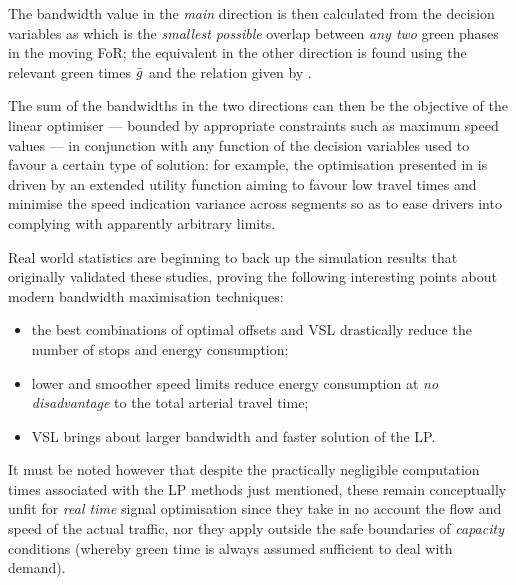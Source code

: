 The bandwidth value in the \emph{main} direction is then calculated from the decision variables as
which is the \emph{smallest possible} overlap between \emph{any two} green phases in the moving FoR; the equivalent in the other direction is found using the relevant green times $\bar{g_{}}$ and the relation given by .

The sum of the bandwidths in the two directions can then be the objective of the linear
optimiser — bounded by appropriate constraints such as maximum speed values — in conjunction with any function of the decision variables used to favour a certain type of solution: for example, the optimisation presented in \citep{de2015arterial} is driven by an extended utility function aiming to favour low travel times and minimise the speed indication variance across segments so as to ease drivers into complying with apparently arbitrary limits.

Real world statistics are beginning to back up the simulation results that originally validated these studies, proving the following interesting points about modern bandwidth maximisation techniques:
\begin{itemize}
\item the best combinations of optimal offsets and VSL drastically reduce the number of stops and energy consumption;
\item lower and smoother speed limits reduce energy consumption at \emph{no disadvantage }to the total arterial travel time;
\item VSL brings about larger bandwidth and faster solution of the LP.
\end{itemize}

It must be noted however that despite the practically negligible computation times associated with the LP methods just mentioned, these remain conceptually unfit for \emph{real time} signal optimisation since they take in no account the flow and speed of the actual traffic, nor they apply outside the safe boundaries of \emph{capacity} conditions (whereby green time is always assumed sufficient to deal with demand).



